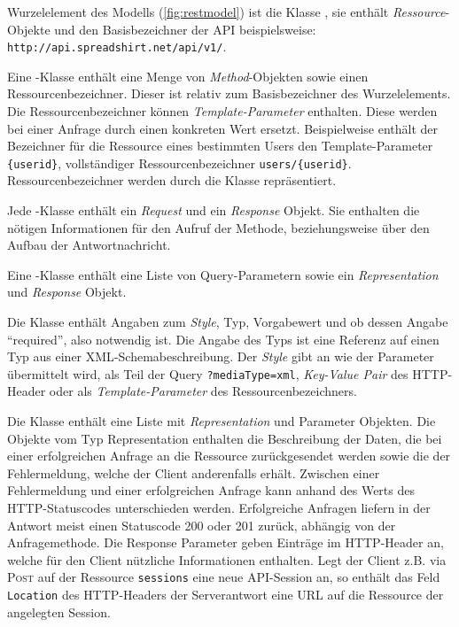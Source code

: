 Wurzelelement des Modells (\cref{fig:restmodel}) ist die Klasse , sie enthält \emph{Ressource}-Objekte und den Basisbezeichner der \gls{API} beispielsweise:\\
\texttt{\small http://api.spreadshirt.net/api/v1/}. 

Eine -Klasse enthält eine Menge von \emph{Method}-Objekten sowie einen Ressourcenbezeichner. Dieser ist relativ zum Basisbezeichner des Wurzelelements. Die Ressourcenbezeichner können \emph{Template-Parameter} enthalten. Diese werden bei einer Anfrage durch einen konkreten Wert ersetzt. Beispielweise enthält der Bezeichner für die Ressource eines bestimmten Users den Template-Parameter \texttt{\{userid\}}, vollständiger Ressourcenbezeichner \texttt{users/\{userid\}}. Ressourcenbezeichner werden durch die Klasse  repräsentiert. 

Jede -Klasse enthält ein \emph{Request} und ein \emph{Response} Objekt. Sie enthalten die nötigen Informationen für den Aufruf der Methode, beziehungsweise über den Aufbau der Antwortnachricht.

Eine -Klasse enthält eine Liste von Query-Parametern sowie ein \emph{Representation} und \emph{Response} Objekt.

Die Klasse  enthält Angaben zum \emph{Style}, Typ, Vorgabewert und ob dessen Angabe \enquote{required}, also notwendig ist. Die Angabe des Typs ist eine Referenz auf einen Typ aus einer \gls{XML}-Schemabeschreibung. Der \emph{Style} gibt an wie der Parameter übermittelt wird, als Teil der Query \texttt{?mediaType=xml}, \emph{Key-Value Pair} des \gls{HTTP}-Header oder als \emph{Template-Parameter} des Ressourcenbezeichners. 

Die Klasse  enthält eine Liste mit \emph{Representation} und Parameter Objekten. Die Objekte vom Typ Representation enthalten die Beschreibung der Daten, die bei einer erfolgreichen Anfrage an die Ressource zurückgesendet werden sowie die der Fehlermeldung, welche der Client anderenfalls erhält. Zwischen einer Fehlermeldung und einer erfolgreichen Anfrage kann anhand des Werts des \gls{HTTP}-Statuscodes unterschieden werden. Erfolgreiche Anfragen liefern in der Antwort meist einen Statuscode 200  oder 201  zurück, abhängig von der Anfragemethode. Die Response Parameter geben Einträge im \gls{HTTP}-Header an, welche für den Client nützliche Informationen enthalten. Legt der Client z.B. via \textsc{Post} auf der Ressource \texttt{sessions} eine neue \gls{API}-Session an, so enthält das Feld \texttt{Location} des \gls{HTTP}-Headers der Serverantwort eine \gls{URL} auf die Ressource der angelegten Session.

